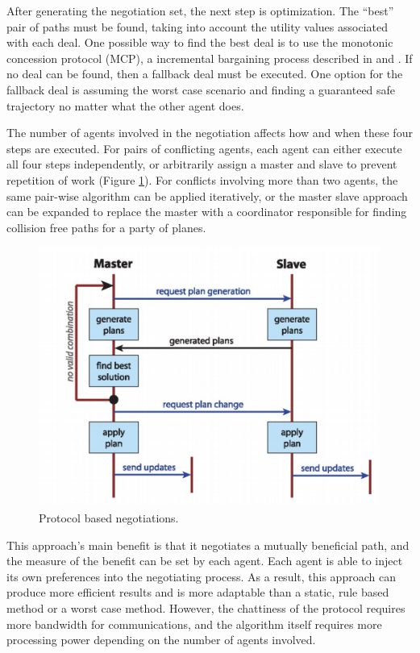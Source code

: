 \documentclass[conference]{IEEEtran}
\begin{document}
After generating the negotiation set, the next step is optimization. The “best” pair of paths must be found, taking into account the utility values associated with each deal. One possible way to find the best deal is to use the monotonic concession protocol (MCP), a incremental bargaining process described in  \cite{wollkind2004automated}  and \cite{zlotkin1989negotiation}. If no deal can be found, then a fallback deal must be executed. One option for the fallback deal is assuming the worst case scenario and finding a guaranteed safe trajectory no matter what the other agent does. 

The number of agents involved in the negotiation affects how and when these four steps are executed. For pairs of conflicting agents, each agent can either execute all four steps independently, or arbitrarily assign a master and slave to prevent repetition of work (Figure \ref{fig:07SislakMaster}). For conflicts involving more than two agents, the same pair-wise algorithm can be applied iteratively, or the master slave approach can be expanded to replace the master with a coordinator responsible for finding collision free paths for a party of planes.

\begin{figure}[h]
	\includegraphics [width=1\columnwidth] {07SislakMasterSlave}
	\caption{Protocol based negotiations. \cite{vsivslak2008agentfly}}
	\label{fig:07SislakMaster}
\end{figure}


This approach's main benefit is that it negotiates a mutually beneficial path, and the measure of the benefit can be set by each agent. Each agent is able to inject its own preferences into the negotiating process. As a result, this approach can produce more efficient results and is more adaptable than a static, rule based method or a worst case method. However, the chattiness of the protocol requires more bandwidth for communications, and the algorithm itself requires more processing power depending on the number of agents involved. 
\end{document}
